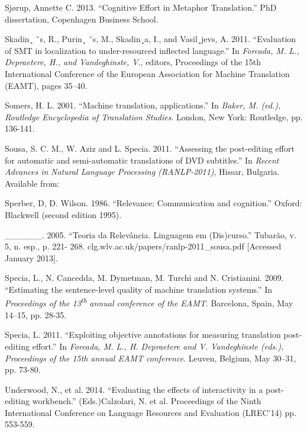\documentclass[output=paper]{langsci/langscibook}
\begin{document}
Sjørup, Annette C. 2013. “Cognitive Effort in Metaphor Translation.” PhD dissertation, Copenhagen Business School.



Skadin¸ ˇs, R., Purin¸ ˇs, M., Skadin¸a, I., and Vasil¸jevs, A. 2011. “Evaluation of SMT in localization to under-resourced inflected language.” In \textit{Forcada, M. L., Depraetere, H., and Vandeghinste, V}., editors, Proceedings of the 15th International Conference of the European Association for Machine Translation (EAMT), pages 35–40.



Somers, H. L. 2001. “Machine translation, applications.” In \textit{Baker, M. (ed.),} \textit{Routledge Encyclopedia of Translation Studies}. London, New York: Routledge, pp. 136-141.



Sousa, S. C. M., W. Aziz and L. Specia. 2011. “Assessing the post-editing effort for automatic and semi-automatic translations of DVD subtitles.” In \textit{Recent Advances in} \textit{Natural Language Processing (RANLP-2011)}, Hissar, Bulgaria. Available from:



Sperber, D, D. Wilson. 1986. “Relevance: Communication and cognition.” Oxford: Blackwell (second edition 1995). 



\_\_\_\_\_\_. 2005. “Teoria da Relevância\textit{.} Linguagem em (Dis)curso.” Tubarão, v. 5, n. esp., p. 221- 268. clg.wlv.ac.uk/papers/ranlp-2011\_sousa.pdf [Accessed January 2013].



Specia, L., N. Cancedda, M. Dymetman, M. Turchi and N. Cristianini. 2009. “Estimating the sentence-level quality of machine translation systems.” In \textit{Proceedings of the 13}\textit{\textsuperscript{th}} \textit{annual conference of the EAMT}. Barcelona, Spain, May 14–15, pp. 28-35. 



Specia, L. 2011. “Exploiting objective annotations for measuring translation post-editing effort.” In \textit{Forcada, M. L., H. Depraetere and V. Vandeghinste (eds.),} \textit{Proceedings of the} \textit{15th annual EAMT conference}. Leuven, Belgium, May 30–31, pp. 73-80.



Underwood, N., et al. 2014.  “Evaluating the effects of interactivity in a post-editing workbench.” (Eds.)Calzolari, N. et al. Proceedings of the Ninth International Conference on Language Resources and Evaluation (LREC'14) pp. 553-559.
\end{document}
